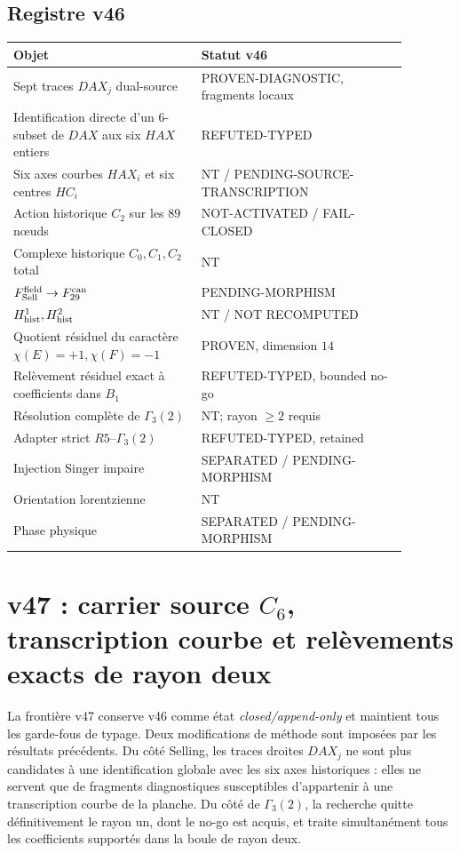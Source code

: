 \documentclass[11pt,a4paper]{article}
\begin{document}
\subsection{Registre v46}
\begin{center}
\begin{tabular}{p{0.42\linewidth}p{0.46\linewidth}}
\toprule
Objet & Statut v46\\
\midrule
Sept traces $DAX_j$ dual-source & PROVEN-DIAGNOSTIC, fragments locaux\\
Identification directe d'un $6$-subset de $DAX$ aux six $HAX$ entiers & REFUTED-TYPED\\
Six axes courbes $HAX_i$ et six centres $HC_i$ & NT / PENDING-SOURCE-TRANSCRIPTION\\
Action historique $C_2$ sur les $89$ nœuds & NOT-ACTIVATED / FAIL-CLOSED\\
Complexe historique $C_0,C_1,C_2$ total & NT\\
$F_{\rm Sell}^{\rm field}\to F_{29}^{\rm can}$ & PENDING-MORPHISM\\
$H^1_{\rm hist},H^2_{\rm hist}$ & NT / NOT RECOMPUTED\\
Quotient résiduel du caractère $\chi(E)=+1,\chi(F)=-1$ & PROVEN, dimension $14$\\
Relèvement résiduel exact à coefficients dans $B_1$ & REFUTED-TYPED, bounded no-go\\
Résolution complète de $\Gamma_3(2)$ & NT; rayon $\ge2$ requis\\
Adapter strict $R5$--$\Gamma_3(2)$ & REFUTED-TYPED, retained\\
Injection Singer impaire & SEPARATED / PENDING-MORPHISM\\
Orientation lorentzienne & NT\\
Phase physique & SEPARATED / PENDING-MORPHISM\\
\bottomrule
\end{tabular}
\end{center}



\section{v47 : carrier source $C_6$, transcription courbe et relèvements exacts de rayon deux}
\label{sec:v47-source-curve-radius2}

La frontière v47 conserve v46 comme état \emph{closed/append-only} et maintient tous les garde-fous de typage. Deux modifications de méthode sont imposées par les résultats précédents. Du côté Selling, les traces droites $DAX_j$ ne sont plus candidates à une identification globale avec les six axes historiques : elles ne servent que de fragments diagnostiques susceptibles d'appartenir à une transcription courbe de la planche. Du côté de $\Gamma_3(2)$, la recherche quitte définitivement le rayon un, dont le no-go est acquis, et traite simultanément tous les coefficients supportés dans la boule de rayon deux.
\end{document}
